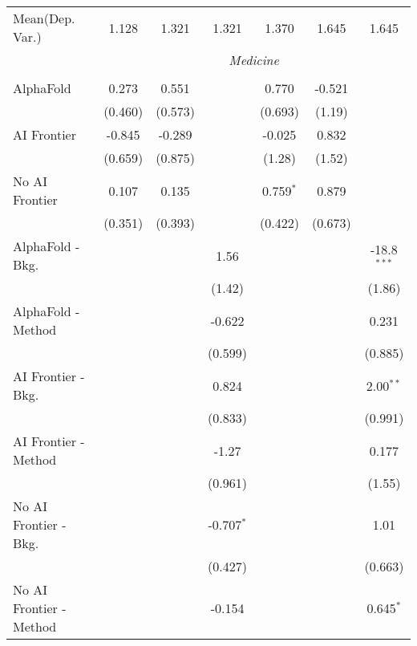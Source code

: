 \begin{tabular}{lcccccc}
Mean(Dep. Var.) & 1.128 & 1.321 & 1.321 & 1.370 & 1.645 & 1.645 \\
 & \multicolumn{6}{c}{\textit{Medicine}} \\ \\
   AlphaFold               & 0.273   & 0.551   &              & 0.770       & -0.521  &   \\   
                           & (0.460) & (0.573) &              & (0.693)     & (1.19)  &   \\   
   AI Frontier             & -0.845  & -0.289  &              & -0.025      & 0.832   &   \\   
                           & (0.659) & (0.875) &              & (1.28)      & (1.52)  &   \\   
   No AI Frontier          & 0.107   & 0.135   &              & 0.759$^{*}$ & 0.879   &   \\   
                           & (0.351) & (0.393) &              & (0.422)     & (0.673) &   \\   
   AlphaFold - Bkg.        &         &         & 1.56         &             &         & -18.8$^{***}$\\   
                           &         &         & (1.42)       &             &         & (1.86)\\   
   AlphaFold - Method      &         &         & -0.622       &             &         & 0.231\\   
                           &         &         & (0.599)      &             &         & (0.885)\\   
   AI Frontier - Bkg.      &         &         & 0.824        &             &         & 2.00$^{**}$\\   
                           &         &         & (0.833)      &             &         & (0.991)\\   
   AI Frontier - Method    &         &         & -1.27        &             &         & 0.177\\   
                           &         &         & (0.961)      &             &         & (1.55)\\   
   No AI Frontier - Bkg.   &         &         & -0.707$^{*}$ &             &         & 1.01\\   
                           &         &         & (0.427)      &             &         & (0.663)\\   
   No AI Frontier - Method &         &         & -0.154       &             &         & 0.645$^{*}$\\   

\end{tabular}

